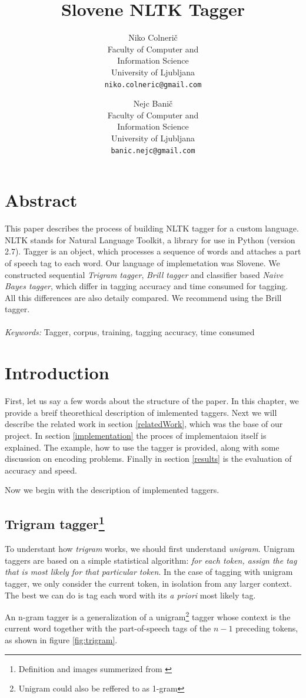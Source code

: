 \documentclass[10pt, conference, compsocconf]{IEEEtran}
\title{Slovene NLTK Tagger}
\author{
	Niko Colnerič \\
	\footnotesize Faculty of Computer and \\
	\footnotesize Information Science \\
	\footnotesize University of Ljubljana \\
	\footnotesize \texttt{niko.colneric@gmail.com} \\
	\and
	Nejc Banič \\
	\footnotesize Faculty of Computer and \\
	\footnotesize Information Science \\
	\footnotesize University of Ljubljana \\
	\footnotesize \texttt{banic.nejc@gmail.com} \\
}
\begin{document}
\maketitle
\thispagestyle{empty}

\section*{Abstract} %
This paper describes the process of building NLTK tagger for a custom language. NLTK stands for Natural Language Toolkit, a library for use in Python (version 2.7).
Tagger is an object, which processes a sequence of words and attaches a part of speech tag to each word.
Our language of implemetation was Slovene.
We constructed sequential \textit{Trigram tagger}, \textit{Brill tagger} and classifier based \textit{Naive Bayes tagger}, which differ in tagging accuracy and time consumed for tagging. All this differences are also detaily compared. We recommend using the Brill tagger.
\\\\
\textit{Keywords:} Tagger, corpus, training, tagging accuracy, time consumed

\section{Introduction} %
First, let us say a few words about the structure of the paper. In this chapter, we provide a breif theorethical description of imlemented taggers. Next we will describe the related work in section \ref{relatedWork}, which was the base of our project. In section \ref{implementation} the proces of implementaion itself is explained. The example, how to use the tagger is provided, along with some discussion on encoding problems. Finally in section \ref{results} is the evaluation of accuracy and speed.
\par
Now we begin with the description of implemented taggers.

\subsection[Trigram tagger]{Trigram tagger\footnote{Definition and images summerized from \cite{NLTKBOOK}}}
To understant how \textit{trigram} works, we should first understand \textit{unigram}.
Unigram taggers are based on a simple statistical algorithm: \textit{for each token, assign the tag that is most likely for that particular token}.
In the case of tagging with unigram tagger, we only consider the current token, in isolation from any larger context. The best we can do is tag each word with its \textit{a priori} most likely tag.
\par
An n-gram tagger is a generalization of a unigram\footnote{Unigram could also be reffered to as 1-gram} tagger whose context is the current word together with the part-of-speech tags of the $n-1$ preceding tokens, as shown in figure \ref{fig:trigram}.
\end{document}
